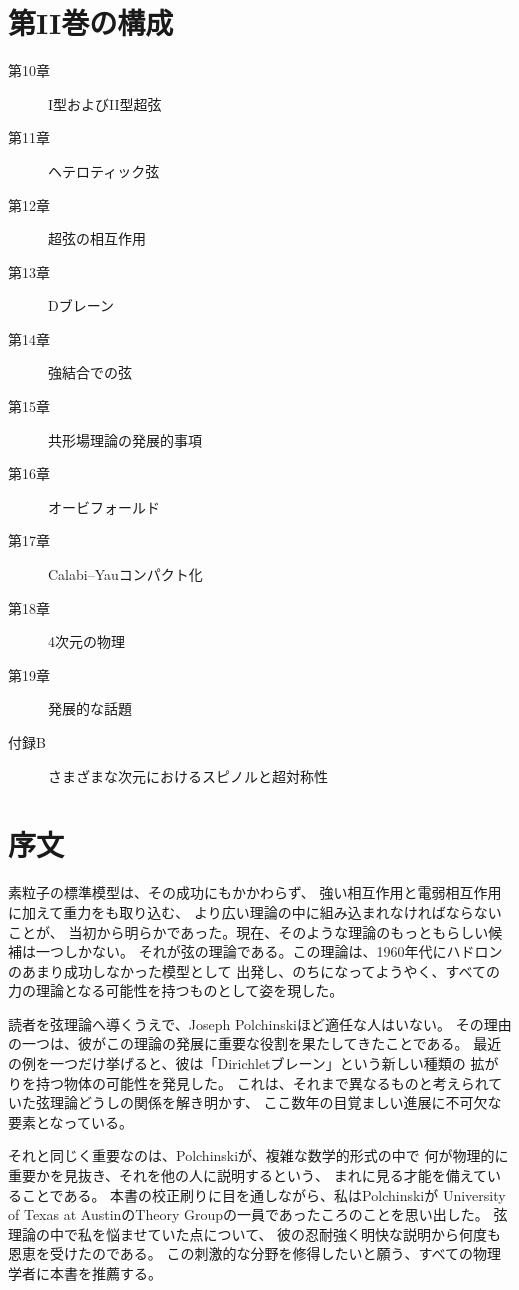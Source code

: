 \section*{第II巻の構成}
\begin{description}
\item[第10章] I型およびII型超弦
\item[第11章] ヘテロティック弦
\item[第12章] 超弦の相互作用
\item[第13章] Dブレーン
\item[第14章] 強結合での弦
\item[第15章] 共形場理論の発展的事項
\item[第16章] オービフォールド
\item[第17章] Calabi--Yauコンパクト化
\item[第18章] 4次元の物理
\item[第19章] 発展的な話題
\item[付録B] さまざまな次元におけるスピノルと超対称性
\end{description}

\clearpage
\section*{序文}
素粒子の標準模型は、その成功にもかかわらず、
強い相互作用と電弱相互作用に加えて重力をも取り込む、
より広い理論の中に組み込まれなければならないことが、
当初から明らかであった。現在、そのような理論のもっともらしい候補は一つしかない。
それが弦の理論である。この理論は、1960年代にハドロンのあまり成功しなかった模型として
出発し、のちになってようやく、すべての力の理論となる可能性を持つものとして姿を現した。

読者を弦理論へ導くうえで、Joseph Polchinskiほど適任な人はいない。
その理由の一つは、彼がこの理論の発展に重要な役割を果たしてきたことである。
最近の例を一つだけ挙げると、彼は「Dirichletブレーン」という新しい種類の
拡がりを持つ物体の可能性を発見した。
これは、それまで異なるものと考えられていた弦理論どうしの関係を解き明かす、
ここ数年の目覚ましい進展に不可欠な要素となっている。

それと同じく重要なのは、Polchinskiが、複雑な数学的形式の中で
何が物理的に重要かを見抜き、それを他の人に説明するという、
まれに見る才能を備えていることである。
本書の校正刷りに目を通しながら、私はPolchinskiが
University of Texas at AustinのTheory Groupの一員であったころのことを思い出した。
弦理論の中で私を悩ませていた点について、
彼の忍耐強く明快な説明から何度も恩恵を受けたのである。
この刺激的な分野を修得したいと願う、すべての物理学者に本書を推薦する。

